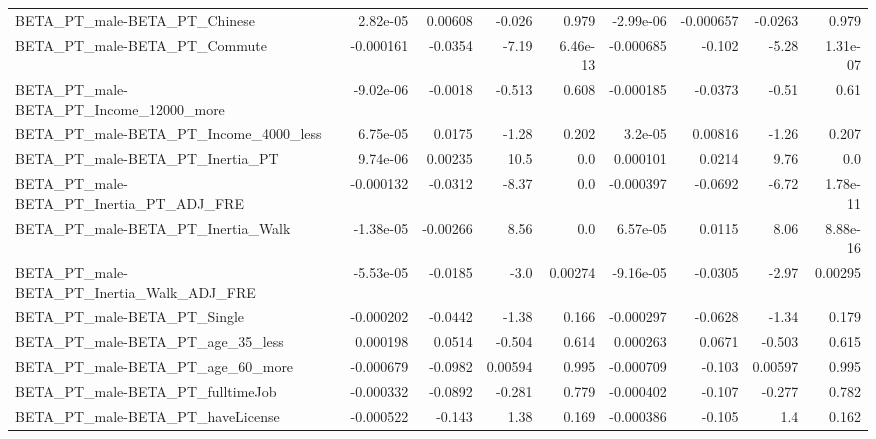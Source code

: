 \begin{tabular}{lrrrrrrrr}
BETA\_PT\_male-BETA\_PT\_Chinese                       &    2.82e-05 &      0.00608 &   -0.026 &    0.979 &  -2.99e-06 &   -0.000657 &      -0.0263 &         0.979 \\
BETA\_PT\_male-BETA\_PT\_Commute                       &   -0.000161 &      -0.0354 &    -7.19 & 6.46e-13 &  -0.000685 &      -0.102 &        -5.28 &      1.31e-07 \\
BETA\_PT\_male-BETA\_PT\_Income\_12000\_more             &   -9.02e-06 &      -0.0018 &   -0.513 &    0.608 &  -0.000185 &     -0.0373 &        -0.51 &          0.61 \\
BETA\_PT\_male-BETA\_PT\_Income\_4000\_less              &    6.75e-05 &       0.0175 &    -1.28 &    0.202 &    3.2e-05 &     0.00816 &        -1.26 &         0.207 \\
BETA\_PT\_male-BETA\_PT\_Inertia\_PT                    &    9.74e-06 &      0.00235 &     10.5 &      0.0 &   0.000101 &      0.0214 &         9.76 &           0.0 \\
BETA\_PT\_male-BETA\_PT\_Inertia\_PT\_ADJ\_FRE            &   -0.000132 &      -0.0312 &    -8.37 &      0.0 &  -0.000397 &     -0.0692 &        -6.72 &      1.78e-11 \\
BETA\_PT\_male-BETA\_PT\_Inertia\_Walk                  &   -1.38e-05 &     -0.00266 &     8.56 &      0.0 &   6.57e-05 &      0.0115 &         8.06 &      8.88e-16 \\
BETA\_PT\_male-BETA\_PT\_Inertia\_Walk\_ADJ\_FRE          &   -5.53e-05 &      -0.0185 &     -3.0 &  0.00274 &  -9.16e-05 &     -0.0305 &        -2.97 &       0.00295 \\
BETA\_PT\_male-BETA\_PT\_Single                        &   -0.000202 &      -0.0442 &    -1.38 &    0.166 &  -0.000297 &     -0.0628 &        -1.34 &         0.179 \\
BETA\_PT\_male-BETA\_PT\_age\_35\_less                   &    0.000198 &       0.0514 &   -0.504 &    0.614 &   0.000263 &      0.0671 &       -0.503 &         0.615 \\
BETA\_PT\_male-BETA\_PT\_age\_60\_more                   &   -0.000679 &      -0.0982 &  0.00594 &    0.995 &  -0.000709 &      -0.103 &      0.00597 &         0.995 \\
BETA\_PT\_male-BETA\_PT\_fulltimeJob                   &   -0.000332 &      -0.0892 &   -0.281 &    0.779 &  -0.000402 &      -0.107 &       -0.277 &         0.782 \\
BETA\_PT\_male-BETA\_PT\_haveLicense                   &   -0.000522 &       -0.143 &     1.38 &    0.169 &  -0.000386 &      -0.105 &          1.4 &         0.162 \\

\end{tabular}
